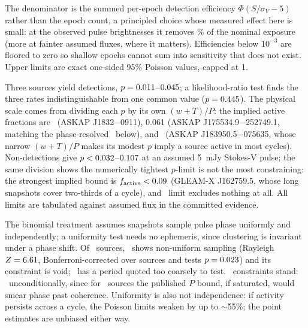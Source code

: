 \documentclass[RNAAS]{aastex631}
\begin{document}
The denominator is the summed per-epoch detection efficiency $\Phi(S/\sigma_V - 5)$ rather
than the epoch count, a principled choice whose measured effect here is small: at the
observed pulse brightnesses it removes \ldEffRemovedHeadlinePct\% of the nominal exposure
(more at fainter assumed fluxes, where it matters). Efficiencies below $10^{-3}$ are floored
to zero so shallow epochs cannot sum into sensitivity that does not exist. Upper limits are
exact one-sided 95\% Poisson values, capped at 1.

Three sources yield detections, $p = 0.011$--$0.045$; a likelihood-ratio test finds the
three rates indistinguishable from one common value ($p = 0.445$). The physical
scale comes from dividing each $p$ by its own $(w+T)/P$: the implied active fractions are
\ldFaDetMin\ (ASKAP J1832$-$0911), 0.061 (ASKAP J175534.9$-$252749.1, matching the
phase-resolved \ldFActive\ below), and \ldFaDetMax\ (ASKAP J183950.5$-$075635, whose narrow
$(w+T)/P$ makes its modest $p$ imply a source active in most cycles). Non-detections give
$p < 0.032$--$0.107$ at an assumed 5~mJy Stokes-V pulse; the same division shows
the numerically tightest $p$-limit is not the most constraining: the strongest implied
bound is $f_{\rm active} < 0.09$ (GLEAM-X J162759.5, whose long snapshots cover
two-thirds of a cycle), and \ldNFaLimVacuous\ limit excludes nothing at all. All limits are
tabulated against assumed flux in the committed evidence.

The binomial treatment assumes snapshots sample pulse phase uniformly and independently; a
uniformity test needs no ephemeris, since clustering is invariant under a phase shift. Of
\ldNSources\ sources, \ldNClustered\ shows non-uniform sampling (Rayleigh $Z = 6.61$,
Bonferroni-corrected over sources and tests $p = 0.023$) and its constraint is void;
\ldNInconclusive\ has a period quoted too coarsely to test. \ldNValid\ constraints stand:
\ldNValidUncond\ unconditionally, since for \ldNPdotCond\ sources the published $\dot P$
bound, if saturated, would smear phase past coherence. Uniformity is also not
independence: if activity persists across a cycle, the Poisson limits weaken by up to
$\sim$55\%; the point estimates are unbiased either way.
\end{document}
